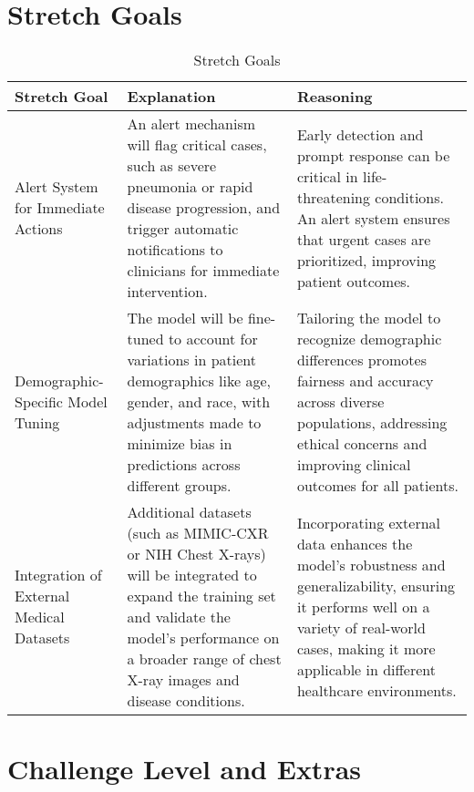 \documentclass{article}
\begin{document}
\section{Stretch Goals}
\begin{table}[ht]
    \hspace*{-2cm}
    \centering
    \begin{tabular}{|p{3cm}|p{6cm}|p{6cm}|}
    \hline
    \textbf{Stretch Goal} & \textbf{Explanation} & \textbf{Reasoning} \\ \hline

    Alert System for Immediate Actions & An alert mechanism will flag critical cases, such as severe pneumonia or rapid disease progression, and trigger automatic notifications to clinicians for immediate intervention. & Early detection and prompt response can be critical in life-threatening conditions. An alert system ensures that urgent cases are prioritized, improving patient outcomes. \\ \hline

    Demographic-Specific Model Tuning & The model will be fine-tuned to account for variations in patient demographics like age, gender, and race, with adjustments made to minimize bias in predictions across different groups. & Tailoring the model to recognize demographic differences promotes fairness and accuracy across diverse populations, addressing ethical concerns and improving clinical outcomes for all patients. \\ \hline

    Integration of External Medical Datasets & Additional datasets (such as MIMIC-CXR or NIH Chest X-rays) will be integrated to expand the training set and validate the model’s performance on a broader range of chest X-ray images and disease conditions. & Incorporating external data enhances the model’s robustness and generalizability, ensuring it performs well on a variety of real-world cases, making it more applicable in different healthcare environments. \\ \hline

    \end{tabular}
    \caption{Stretch Goals}
\end{table}
\section{Challenge Level and Extras}

\end{document}
